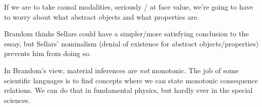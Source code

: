 If we are to take causal modalities, seriously / at face value, we're going to have to worry about what abstract objects and what properties are.

Brandom thinks Sellars could have a simpler/more satisfying conclusion to the essay, but Sellars' nominalism (denial of existence for abstract objects/properties) prevents him from doing so.

In Brandom's view, material inferences are \emph{not} monotonic. The job of some scientific languages is to find concepts where we can state monotonic consequence relations. We can do that in fundamental physics, but hardly ever in the special sciences.

